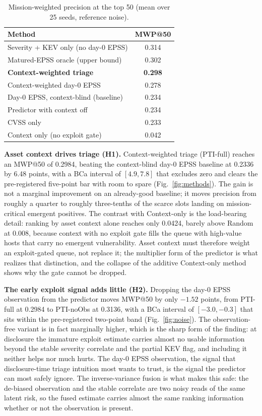 \documentclass[journal]{IEEEtran}
\begin{document}
\begin{table}[t]
\centering
\caption{Mission-weighted precision at the top 50 (mean over 25 seeds, reference noise).}
\label{tab:mwp}
\footnotesize
\begin{tabular}{@{}lc@{}}
\toprule
Method & MWP@50 \\
\midrule
Severity + KEV only (no day-0 EPSS) & 0.314 \\
Matured-EPSS oracle (upper bound) & 0.302 \\
\textbf{Context-weighted triage} & \textbf{0.298} \\
Context-weighted day-0 EPSS & 0.278 \\
Day-0 EPSS, context-blind (baseline) & 0.234 \\
Predictor with context off & 0.234 \\
CVSS only & 0.233 \\
Context only (no exploit gate) & 0.042 \\
\bottomrule
\end{tabular}
\end{table}

\textbf{Asset context drives triage (H1).} Context-weighted triage (PTI-full) reaches an MWP@50 of
0.2984, beating the context-blind day-0 EPSS baseline at 0.2336 by 6.48 points, with a BCa interval
of $[4.9, 7.8]$ that excludes zero and clears the pre-registered five-point bar with room to spare
(Fig.~\ref{fig:methods}). The gain is not a marginal improvement on an already-good baseline; it
moves precision from roughly a quarter to roughly three-tenths of the scarce slots landing on
mission-critical emergent positives. The contrast with Context-only is the load-bearing detail:
ranking by asset context alone reaches only 0.0424, barely above Random at 0.008, because context
with no exploit gate fills the queue with high-value hosts that carry no emergent vulnerability.
Asset context must therefore weight an exploit-gated queue, not replace it; the multiplier form of
the predictor is what realizes that distinction, and the collapse of the additive Context-only
method shows why the gate cannot be dropped.

\textbf{The early exploit signal adds little (H2).} Dropping the day-0 EPSS observation from the
predictor moves MWP@50 by only $-1.52$ points, from PTI-full at 0.2984 to PTI-noObs at 0.3136, with
a BCa interval of $[-3.0, -0.3]$ that sits within the pre-registered two-point band
(Fig.~\ref{fig:noise}). The observation-free variant is in fact marginally higher, which is the
sharp form of the finding: at disclosure the immature exploit estimate carries almost no usable
information beyond the stable severity correlate and the partial KEV flag, and including it neither
helps nor much hurts. The day-0 EPSS observation, the signal that disclosure-time triage intuition
most wants to trust, is the signal the predictor can most safely ignore. The inverse-variance fusion
is what makes this safe: the de-biased observation and the stable correlate are two noisy reads of
the same latent risk, so the fused estimate carries almost the same ranking information whether or
not the observation is present.
\end{document}
